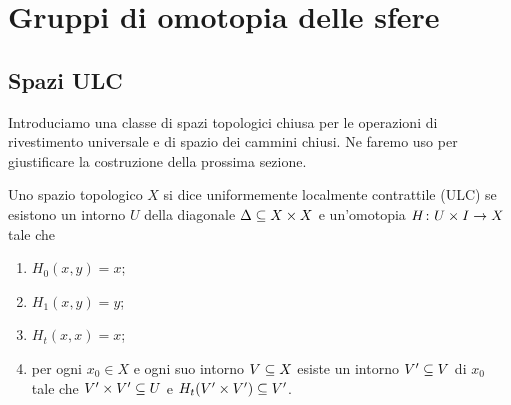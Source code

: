\chapter{Gruppi di omotopia delle sfere}

\section{Spazi ULC}

Introduciamo una classe di spazi topologici chiusa per le operazioni di rivestimento universale e di spazio dei cammini chiusi. Ne faremo uso per giustificare la costruzione della prossima sezione.

\begin{definition}
Uno spazio topologico $X$ si dice uniformemente localmente contrattile (ULC) se esistono un intorno $U$ della diagonale $\Delta\subseteq X\times X$ e un'omotopia $H\colon U\times I\to X$ tale che
\begin{enumerate}
\item\label{ULC:pr1} $H_0(x,y)=x$;
\item\label{ULC:pr2} $H_1(x,y)=y$;
\item\label{ULC:pr3} $H_t(x,x)=x$;
\item\label{ULC:pr4} per ogni $x_0\in X$ e ogni suo intorno $V\subseteq X$ esiste un intorno $V'\subseteq V$ di $x_0$ tale che $V'\times V'\subseteq U$ e $H_t(V'\times V')\subseteq V'$.
\end{enumerate}
\end{definition}

